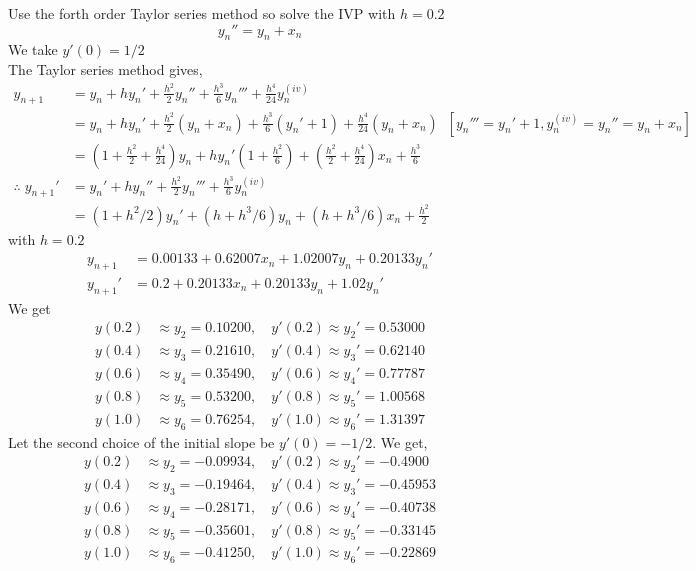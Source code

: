 \documentclass[../main-sheet.tex]{subfiles}
\begin{document}
\begin{soln}
    Use the forth order Taylor series method so solve the IVP with \(h=0.2\)
    \[y_n''=y_n+x_n\]
    We take \(y'(0)=1/2\)\\
    The Taylor series method gives,
    \begin{align*}
        y_{n+1}&=y_n+hy_n'+\frac{h^2}{2}y_n''+\frac{h^3}{6}y_n'''+\frac{h^4}{24}y_n^{(iv)}\\
        &=y_n+hy_n'+\frac{h^2}{2}(y_n+x_n)+\frac{h^3}{6}(y_n'+1)+\frac{h^4}{24}(y_n+x_n)\;\;[y_n'''=y_n'+1,y_n^{(iv)}=y_n''=y_n+x_n]\\
        &=(1+\frac{h^2}{2}+\frac{h^4}{24})y_n+hy_n'(1+\frac{h^2}{6})+(\frac{h^2}{2}+\frac{h^4}{24})x_n+\frac{h^3}{6}\\
        \therefore\;y_{n+1}'&=y_n'+hy_n''+\frac{h^2}{2}y_n'''+\frac{h^3}{6}y_n^{(iv)}\\
        &=(1+h^2/2)y_n'+(h+h^3/6)y_n+(h+h^3/6)x_n+\frac{h^2}{2}
    \end{align*}
    with \(h=0.2\)
    \begin{align*}
        y_{n+1}&=0.00133+0.62007x_n+1.02007y_n+0.20133y_n'\\
        y_{n+1}'&=0.2+0.20133 x_n+0.20133 y_n+1.02y_n'
    \end{align*}
    We get
    \begin{align*}
        y(0.2)&\approx y_2=0.10200,\quad y'(0.2)\approx y_2'=0.53000\\
        y(0.4)&\approx y_3=0.21610,\quad y'(0.4)\approx y_3'=0.62140\\
        y(0.6)&\approx y_4=0.35490,\quad y'(0.6)\approx y_4'=0.77787\\
        y(0.8)&\approx y_5=0.53200,\quad y'(0.8)\approx y_5'=1.00568\\
        y(1.0)&\approx y_6=0.76254,\quad y'(1.0)\approx y_6'=1.31397
    \end{align*}
    Let the second choice of the initial slope be \(y'(0)=-1/2\). We get,
    \begin{align*}
        y(0.2)&\approx y_2=-0.09934,\quad y'(0.2)\approx y_2'=-0.4900\\
        y(0.4)&\approx y_3=-0.19464,\quad y'(0.4)\approx y_3'=-0.45953\\
        y(0.6)&\approx y_4=-0.28171,\quad y'(0.6)\approx y_4'=-0.40738\\
        y(0.8)&\approx y_5=-0.35601,\quad y'(0.8)\approx y_5'=-0.33145\\
        y(1.0)&\approx y_6=-0.41250,\quad y'(1.0)\approx y_6'=-0.22869

\end{align*}
\end{soln}
\end{document}
